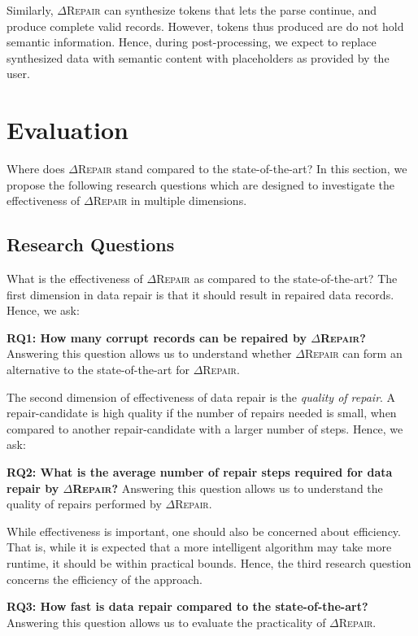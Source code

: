 \documentclass[acmsmall,screen,review,anonymous]{acmart}
\newcommand{\dtask}{data repair\xspace}
\newcommand{\approach}{\textsc{$\Delta$Repair}\xspace}
\newcommand{\drepair}{\approach}
\begin{document}
Similarly,
\drepair can synthesize tokens that lets the parse continue, and produce
complete valid records. However, tokens thus produced are do not hold semantic information.
Hence, during post-processing, we expect to replace synthesized data with
semantic content with placeholders as provided by the user.

\section{Evaluation}
\label{sec:evaluation}
Where does \drepair stand compared to the state-of-the-art? In this section, we
propose the following research questions which are designed to investigate the
effectiveness of \drepair in multiple dimensions.

\subsection{Research Questions}
What is the effectiveness of \drepair as compared to the state-of-the-art?
The first dimension in \dtask is that it should result in repaired data records.
Hence, we ask:

\noindent\textbf{RQ1: How many corrupt records can be repaired by \drepair?} Answering this
question allows us to understand whether \drepair can form an alternative to the
state-of-the-art for \drepair.

The second dimension of effectiveness of \dtask is the \emph{quality of repair}.
A repair-candidate is high quality if the number of repairs needed is small,
when compared to another repair-candidate with a larger number of steps.
Hence, we ask:

\noindent\textbf{RQ2: What is the average number of repair steps required for \dtask by \drepair?}
Answering this question allows us to understand the quality of repairs
performed by \drepair.

While effectiveness is important, one should also be concerned about efficiency.
That is, while it is expected that a more intelligent algorithm may take more
runtime, it should be within practical bounds. Hence, the third research
question concerns the efficiency of the approach.

\noindent\textbf{RQ3: How fast is \dtask compared to the state-of-the-art?}
Answering this question allows us to evaluate the practicality of \drepair.
\end{document}
